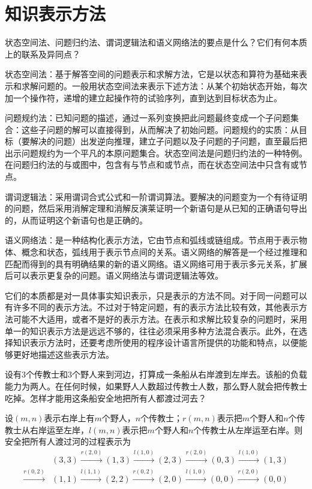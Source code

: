 \chapter{知识表示方法}

\begin{question}
状态空间法、问题归约法、谓词逻辑法和语义网络法的要点是什么？它们有何本质上的联系及异同点？
\end{question}	
\begin{solution}
状态空间法：基于解答空间的问题表示和求解方法，它是以状态和算符为基础来表示和求解问题的。一般用状态空间法来表示下述方法：从某个初始状态开始，每次加一个操作符，递增的建立起操作符的试验序列，直到达到目标状态为止。 \par
问题规约法：已知问题的描述，通过一系列变换把此问题最终变成一个子问题集合：这些子问题的解可以直接得到，从而解决了初始问题。问题规约的实质：从目标（要解决的问题）出发逆向推理，建立子问题以及子问题的子问题，直至最后把出示问题规约为一个平凡的本原问题集合。状态空间法是问题归约法的一种特例。在问题归约法的与或图中，包含有与节点和或节点，而在状态空间法中只含有或节点。 \par
谓词逻辑法：采用谓词合式公式和一阶谓词算法。要解决的问题变为一个有待证明的问题，然后采用消解定理和消解反演莱证明一个新语句是从已知的正确语句导出的，从而证明这个新语句也是正确的。\par
语义网络法：是一种结构化表示方法，它由节点和弧线或链组成。节点用于表示物体、概念和状态，弧线用于表示节点间的关系。语义网络的解答是一个经过推理和匹配而得到的具有明确结果的新的语义网络。语义网络可用于表示多元关系，扩展后可以表示更复杂的问题。语义网络法与谓词逻辑法等效。\par
它们的本质都是对一具体事实知识表示，只是表示的方法不同。对于同一问题可以有许多不同的表示方法。不过对于特定问题，有的表示方法比较有效，其他表示方法可能不大适用，或者不是好的表示方法。在表示和求解比较复杂的问题时，采用单一的知识表示方法是远远不够的，往往必须采用多种方法混合表示。此外，在选择知识表示方法时，还要考虑所使用的程序设计语言所提供的功能和特点，以便能够更好地描述这些表示方法。
\end{solution}

\begin{question}
设有$3$个传教士和$3$个野人来到河边，打算成一条船从右岸渡到左岸去。该船的负载能力为两人。在任何时候，如果野人人数超过传教士人数，那么野人就会把传教士吃掉。怎样才能用这条船安全地把所有人都渡过河去？
\end{question}
\begin{solution}
设$(m,n)$表示右岸上有$m$个野人，$n$个传教士；$r(m,n)$表示把$m$个野人和$n$个传教士从右岸运至左岸，$l(m,n)$表示把$m$个野人和$n$个传教士从左岸运至右岸。则安全把所有人渡过河的过程表示为
\begin{align*}
& (3,3) \xrightarrow{r(2,0)} (1,3) \xrightarrow{l(1,0)} (2,3) 
	\xrightarrow{r(2,0)} (0,3) \xrightarrow{l(1,0)} (1,3) \\
	\xrightarrow{r(0,2)} & (1,1) \xrightarrow{l(1,1)} (2,2) 
	\xrightarrow{r(0,2)} (2,0) \xrightarrow{l(1,0)} (0,0) \xrightarrow{r(2,0)} (0,0)
\end{align*}
\end{solution}

